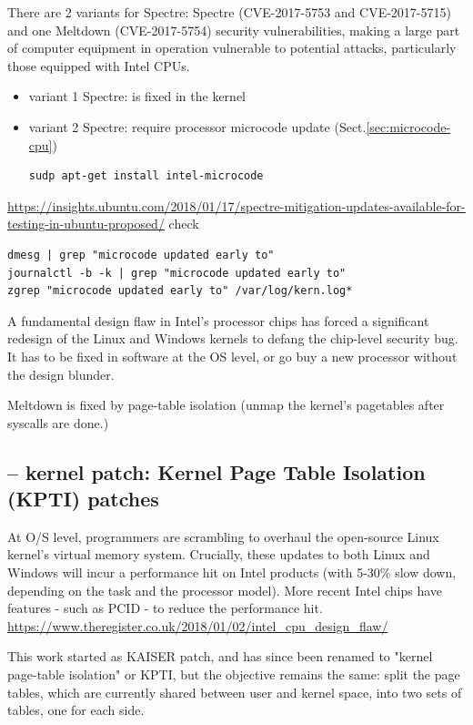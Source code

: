 There are 2 variants for Spectre: Spectre (CVE-2017-5753 and CVE-2017-5715) and
one Meltdown (CVE-2017-5754) security vulnerabilities, making a large part of
computer equipment in operation vulnerable to potential attacks, particularly
those equipped with Intel CPUs.
\begin{itemize}
  \item variant 1 Spectre: is fixed in the kernel
  
  \item variant 2 Spectre: require processor microcode update
  (Sect.\ref{sec:microcode-cpu})
  
\begin{verbatim}
sudp apt-get install intel-microcode
\end{verbatim}
\end{itemize}
\url{https://insights.ubuntu.com/2018/01/17/spectre-mitigation-updates-available-for-testing-in-ubuntu-proposed/}
check
\begin{verbatim}
dmesg | grep "microcode updated early to"
journalctl -b -k | grep "microcode updated early to"
zgrep "microcode updated early to" /var/log/kern.log*
\end{verbatim}


A fundamental design flaw in Intel's processor chips has forced a significant
redesign of the Linux and Windows kernels to defang the chip-level security bug.
It has to be fixed in software at the OS level, or go buy a new processor
without the design blunder.

Meltdown is fixed by page-table isolation (unmap the kernel's pagetables after
syscalls are done.)

\subsection{-- kernel patch: Kernel Page Table Isolation (KPTI) patches}
\label{sec:KPTI}
\label{sec:kernel-patch-Spectre}

At O/S level, programmers are scrambling to overhaul the open-source Linux
kernel's virtual memory system.  Crucially, these updates to both Linux and
Windows will incur a performance hit on Intel products (with 5-30\% slow down,
depending on the task and the processor model).
More recent Intel chips have features - such as PCID - to reduce the performance
hit. \url{https://www.theregister.co.uk/2018/01/02/intel_cpu_design_flaw/}

This work started as KAISER patch, and has since been renamed to "kernel
page-table isolation" or KPTI, but the objective remains the same: split the
page tables, which are currently shared between user and kernel space, into two
sets of tables, one for each side.

